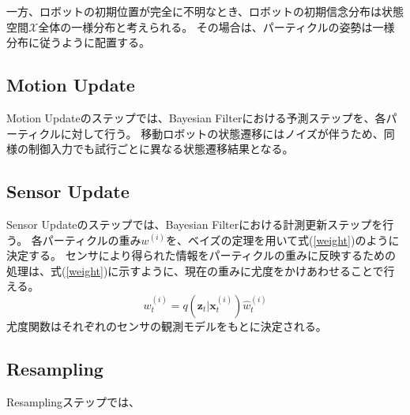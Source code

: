 一方、ロボットの初期位置が完全に不明なとき、ロボットの初期信念分布は状態空間$\mathcal{X}$全体の一様分布と考えられる。
その場合は、パーティクルの姿勢は一様分布に従うように配置する。



\subsection{Motion Update}

Motion Updateのステップでは、Bayesian Filterにおける予測ステップを、各パーティクルに対して行う。
移動ロボットの状態遷移にはノイズが伴うため、同様の制御入力でも試行ごとに異なる状態遷移結果となる。

\subsection{Sensor Update}

Sensor Updateのステップでは、Bayesian Filterにおける計測更新ステップを行う。
各パーティクルの重み$w^{(i)}$を、ベイズの定理を用いて式(\ref{weight})のように決定する。
センサにより得られた情報をパーティクルの重みに反映するための処理は、式(\ref{weight})に示すように、現在の重みに尤度をかけあわせることで行える。
\begin{equation}
\label{weight}
  w^{(i)}_{t} = q(\bm{z}_{t} | \bm{x}^{(i)}_{t}) \hat{w}^{(i)}_{t}
\end{equation}
尤度関数はそれぞれのセンサの観測モデルをもとに決定される。


\subsection{Resampling}
Resamplingステップでは、
